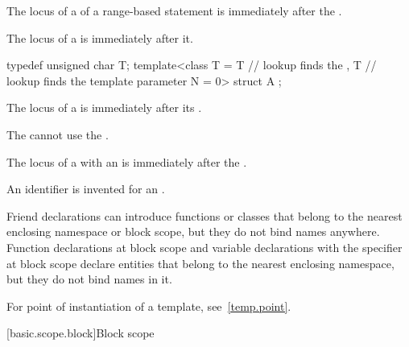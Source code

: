 \pnum
The locus of a 
of a range-based  statement
is immediately after the .

\pnum
The locus of a  is immediately after it.
\begin{example}
\begin{codeblock}
typedef unsigned char T;
template<class T
  = T               // lookup finds the 
  , T               // lookup finds the template parameter
    N = 0> struct A { };
\end{codeblock}
\end{example}

\pnum
The locus of a 
is immediately after its .
\begin{note}
The  cannot use
the .
\end{note}

\pnum
The locus of a 
with an 
is immediately after the .
\begin{note}
An identifier is invented
for an .
\end{note}

\pnum
\begin{note}
Friend declarations can introduce functions or classes
that belong to the nearest enclosing namespace or block scope,
but they do not bind names anywhere.
Function declarations at block scope and
variable declarations with the  specifier at block scope
declare entities
that belong to the nearest enclosing namespace,
but they do not bind names in it.
\end{note}

\pnum
\begin{note}
For point of instantiation of a template, see~\ref{temp.point}.
\end{note}

[basic.scope.block]{Block scope}

%


